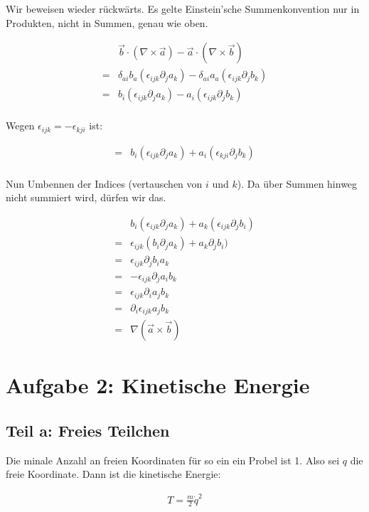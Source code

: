 \documentclass[a4paper,german,12pt,smallheadings]{scrartcl}
\begin{document}
Wir beweisen wieder rückwärts. Es gelte Einstein'sche Summenkonvention nur in
Produkten, nicht in Summen, genau wie oben.

\begin{align*}
  &\vec{b} \cdot (\nabla \times \vec{a}) - \vec{a} \cdot (\nabla \times \vec{b})\\
  =&\delta_{ai} b_a (\epsilon_{ijk} \partial_j a_k) - \delta_{ai} a_a (\epsilon_{ijk} \partial_j b_k)\\
  =&b_i (\epsilon_{ijk} \partial_j a_k) - a_i (\epsilon_{ijk} \partial_j b_k)\\
\end{align*}

Wegen $\epsilon_{ijk} = -\epsilon_{kji}$ ist:

\begin{align*}
  =&b_i (\epsilon_{ijk} \partial_j a_k) + a_i (\epsilon_{kji} \partial_j b_k)\\
\end{align*}

Nun Umbennen der Indices (vertauschen von $i$ und $k$). Da über Summen hinweg
nicht summiert wird, dürfen wir das.

\begin{align*}
  &b_i (\epsilon_{ijk} \partial_j a_k) + a_k (\epsilon_{ijk} \partial_j b_i)\\
  =&\epsilon_{ijk} (b_i \partial_j a_k) + a_k \partial_j b_i)\\
  =&\epsilon_{ijk} \partial_j b_i a_k\\
  =&-\epsilon_{ijk} \partial_j a_i b_k\\
  =&\epsilon_{ijk} \partial_i a_j b_k\\
  =&\partial_i \epsilon_{ijk} a_j b_k\\
  =&\nabla (\vec{a} \times \vec{b})
\end{align*}

\section*{Aufgabe 2: Kinetische Energie}
\subsection*{Teil a: Freies Teilchen}

Die minale Anzahl an freien Koordinaten für so ein ein Probel ist 1. Also sei
$q$ die freie Koordinate. Dann ist die kinetische Energie:

\begin{align*}
  T = \frac{m}{2} \dot{q}^2
\end{align*}
\end{document}
